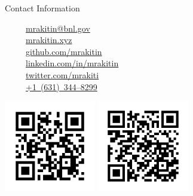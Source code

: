 \documentclass[final]{beamer}
\newlength{\onecolwid}
\newcommand{\colorify}[1]{\textcolor{linkcolor}{#1}}
\newcommand{\mylinkn}[2]{\href{#1}{\colorify{#2}}}
\newcommand{\mylinkm}[1]{\href{mailto:#1?subject=Your poster at 2017 NSLS-II and CFN Users' Meeting}{\colorify{#1}}}
\newcommand{\mylinkt}[1]{\href{tel:#1}{#1}}
\begin{document}
\begin{frame}[t]
\begin{columns}[t]
\begin{column}{\onecolwid}

\begin{alertblock}{\faSendO{} Contact Information}

~~~\faEnvelopeO~~\mylinkm{mrakitin@bnl.gov} \\
~~~\faGlobe~~\mylinkn{https://mrakitin.xyz}{mrakitin.xyz} \\
~~~\faGithub~~\mylinkn{https://github.com/mrakitin}{github.com/mrakitin} \\
~~~\faLinkedinSquare~~\mylinkn{https://www.linkedin.com/in/mrakitin}{linkedin.com/in/mrakitin} \\
~~~\faTwitter~~\mylinkn{https://twitter.com/mrakiti}{twitter.com/mrakiti} \\
~~~\faPhone~~\mylinkt{+1~(631)~344--8299} \\

\end{alertblock}


\begin{minipage}[t]{0.48\linewidth}
\includegraphics[height=4.0cm]{images/qr_code_beta.jpg}
\includegraphics[height=4.0cm]{images/qr_code_github_radiasoft_sirepo.jpg}
\end{minipage}


\end{column} %

\end{columns} %

\end{frame} %
\end{document}
